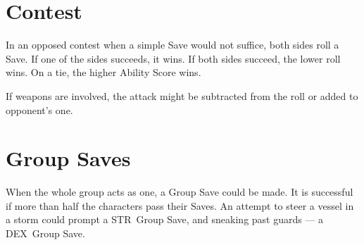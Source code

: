 \documentclass[itdr/core]{subfiles}
\begin{document}
\section{Contest}
In an opposed contest when a simple Save would not suffice, both sides roll a Save. If one of the sides succeeds, it wins. If both sides succeed, the lower roll wins. On a tie, the higher Ability Score wins.

If weapons are involved, the attack might be subtracted from the roll or added to opponent's one.

\vfill

\section{Group Saves}
When the whole group acts as one, a Group Save could be made. It is successful if more than half the characters pass their Saves. An attempt to steer a vessel in a storm could prompt a STR~Group Save, and sneaking past guards --- a DEX~Group Save.

\vfill

\begin{comment}
\section{Gods, Religion, and Disciples}
\index{Religion}
\index{Disciple}
\index{Creed}

The nature of divine presence is highly dependent on a specific setting and thus is left to your discretion. Some worlds could be completely devoid of divine influence (though local cults might still have supernatural powers from some other source), while dwellers of other worlds can regularly observe their gods' interventions in the deals of mortals.

\subparagraph{Disciple} Class and its Creeds from the \textbf{\customref{ch:appendix_c}{Appendix C: Class-ic Edition}} could be used as a Feature to represent the most devoted adepts of cryptic cults. Unlike other Features, this one has a prerequisite of the character being a worshipper of the relevant set of teachings. When obtaining a new Experience Level, follow standard rules. Additionally, from Expert onwards, Disciples gain d4 (up to their WIL~/~2, rounded down) Followers (3hp, Simple Weapon) each time they visit a friendly settlement  and are responsible for their food, shelter, equipment, etc.
\end{comment}
\end{document}
